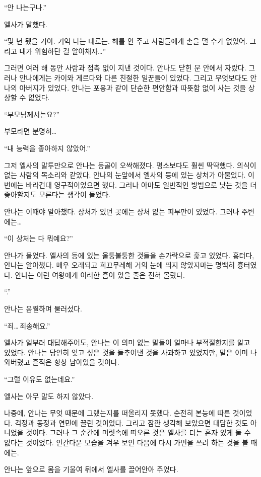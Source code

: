 `` 안 나는구나.''

엘사가 말했다.

``몇 년 됐을 거야. 기억 나는 대로는. 해를 안 주고 사람들에게 손을 댈 수가 없었어. 그리고 내가 위험하단 걸 알아채자\ldots''

그러면 여러 해 동안 사람과 접촉 없이 지낸 것이다. 안나도 닫힌 문 안에서 자랐다. 그러나 안나에게는 카이와 게르다와 다른 친절한 일꾼들이 있었다. 그리고 무엇보다도 안나의 아버지가 있었다. 안나는 포옹과 같이 단순한 편안함과 따뜻함 없이 사는 것을 상상할 수 없었다.

``부모님께서는요?''

부모라면 분명히\ldots

``내 능력을 좋아하지 않았어.''

그저 엘사의 말투만으로 안나는 등골이 오싹해졌다. 평소보다도 훨씬 딱딱했다. 의식이 없는 사람의 목소리와 같았다. 안나의 눈앞에서 엘사의 등에 있는 상처가 아물었다. 이번에는 바라건대 영구적이었으면 했다. 그러나 아마도 일반적인 방법으로 낫는 것을 더 좋아할지도 모른다는 생각이 들었다.

안나는 이때야 알아챘다. 상처가 있던 곳에는 상처 없는 피부만이 있었다. 그러나 주변에는\ldots

``이 상처는 다 뭐예요?''

안나가 물었다. 엘사의 등에 있는 울퉁불퉁한 것들을 손가락으로 훑고 있었다. 흉터다, 안나는 알아챘다. 매우 오래되고 희끄무레해 거의 눈에 띄지 않았지마는 명백히 흉터였다. 안나는 이런 여왕에게 이러한 흠이 있을 줄은 전혀 몰랐다.

``.''

안나는 움찔하며 물러섰다.

``죄\ldots\,죄송해요.''

엘사가 일부러 대답해주어도, 안나는 이 의미 없는 말들이 얼마나 부적절한지를 알고 있었다. 안나는 당연히 잊고 싶은 것을 들추어낸 것을 사과하고 있었지만, 말은 이미 나와버렸고 흔적은 항상 남아있을 것이다.

``그럴 이유도 없는데요.''

엘사는 아무 말도 하지 않았다.

나중에, 안나는 무엇 때문에 그랬는지를 떠올리지 못했다. 순전히 본능에 따른 것이었다. 걱정과 동정과 연민에 끌린 것이었다. 그리고 잠깐 생각해 보았으면 대담한 것도 아니었을 것이다. 그러나 그 순간에 머릿속에 떠오른 것은 엘사를 더는 혼자 있게 둘 수 없다는 것이었다. 인간다운 모습을 겨우 보인 다음에 다시 가면을 쓰려 하는 것을 볼 때에는.

안나는 앞으로 몸을 기울여 뒤에서 엘사를 끌어안아 주었다.

